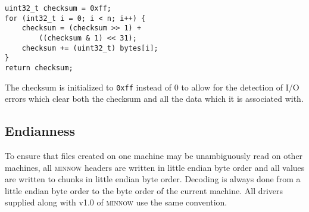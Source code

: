 \documentclass[numberedappendix,apj]{emulateapj}
\begin{document}
\begin{verbatim}
uint32_t checksum = 0xff;
for (int32_t i = 0; i < n; i++) {
    checksum = (checksum >> 1) +
        ((checksum & 1) << 31);
    checksum += (uint32_t) bytes[i];
}
return checksum;
\end{verbatim}

The checksum is initialized to \texttt{0xff} instead of 0 to allow for the
detection of I/O errors which clear both the checksum and all the data which it
is associated with.

\subsection{Endianness}
\label{sec:endianness}

To ensure that files created on one machine may be unambiguously read on other
machines, all \textsc{minnow} headers are written in little endian byte order
and all values are written to chunks in little endian byte order. Decoding is
always done from a little endian byte order to the byte order of the current
machine. All drivers supplied along with v1.0 of \textsc{minnow} use the same
convention.
\end{document}
